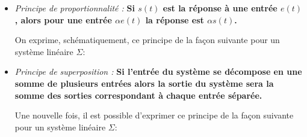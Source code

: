 \begin{itemize}
    \item \emph{Principe de proportionnalité :}
        \textbf{Si $s(t)$ est la réponse à une entrée $e(t)$, alors pour une entrée $\alpha e(t)$
        la réponse est $\alpha s(t)$.}
        
    On exprime, schématiquement, ce principe de la façon suivante pour 
    un système linéaire $\Sigma$:
    \begin{center}
    \end{center}


    \item \emph{Principe de superposition :}
     \textbf{Si l'entrée du système se décompose en une somme 
        de plusieurs entrées alors la sortie du système sera la somme des 
        sorties correspondant à chaque entrée séparée.}

    Une nouvelle fois, il est possible d'exprimer ce principe de la façon suivante pour 
    un système linéaire $\Sigma$:
    \begin{center}
    \end{center}


\end{itemize}
